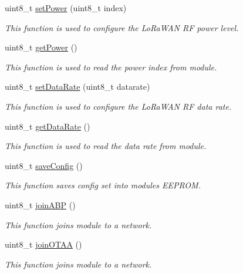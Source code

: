 \begin{DoxyCompactItemize}
uint8\+\_\+t \hyperlink{class_wasp_lo_ra_w_a_n_a47eb3c84e7edc5fe5dcec03bb4a8434e}{set\+Power} (uint8\+\_\+t index)
\begin{DoxyCompactList}\small\item\em This function is used to configure the Lo\+Ra\+W\+AN RF power level. \end{DoxyCompactList}\item 
uint8\+\_\+t \hyperlink{class_wasp_lo_ra_w_a_n_ae81e4e760467d7a39815cdc87a80b3ff}{get\+Power} ()
\begin{DoxyCompactList}\small\item\em This function is used to read the power index from module. \end{DoxyCompactList}\item 
uint8\+\_\+t \hyperlink{class_wasp_lo_ra_w_a_n_a5c8cfbfe49432d26a56d27100f748f47}{set\+Data\+Rate} (uint8\+\_\+t datarate)
\begin{DoxyCompactList}\small\item\em This function is used to configure the Lo\+Ra\+W\+AN RF data rate. \end{DoxyCompactList}\item 
uint8\+\_\+t \hyperlink{class_wasp_lo_ra_w_a_n_acd1b1ae93f145a608e1481bdb5aa497d}{get\+Data\+Rate} ()
\begin{DoxyCompactList}\small\item\em This function is used to read the data rate from module. \end{DoxyCompactList}\item 
uint8\+\_\+t \hyperlink{class_wasp_lo_ra_w_a_n_a98c4324d952d16243f5ca324ce6a2a0d}{save\+Config} ()
\begin{DoxyCompactList}\small\item\em This function saves config set into module\textquotesingle{}s E\+E\+P\+R\+OM. \end{DoxyCompactList}\item 
uint8\+\_\+t \hyperlink{class_wasp_lo_ra_w_a_n_aea55cdf82446087c531aca5abebe5d1c}{join\+A\+BP} ()
\begin{DoxyCompactList}\small\item\em This function joins module to a network. \end{DoxyCompactList}\item 
uint8\+\_\+t \hyperlink{class_wasp_lo_ra_w_a_n_a51fb25b397d971c7af02c393575ad243}{join\+O\+T\+AA} ()
\begin{DoxyCompactList}\small\item\em This function joins module to a network. \end{DoxyCompactList}\item 

\end{DoxyCompactItemize}
